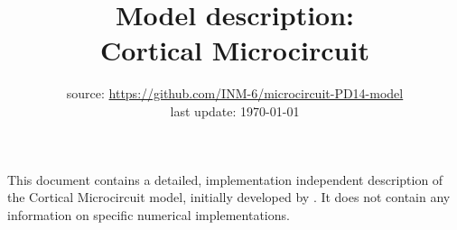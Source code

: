 \documentclass[10pt,a4paper,twoside,american]{article}
\theoremstyle{definitionstyle}
\begin{document}
\title{Model description:\\ \textbf{Cortical Microcircuit} \citep{Potjans14}}
\author{}
\date{%
  source: \href{https://github.com/INM-6/microcircuit-PD14-model}{https://github.com/INM-6/microcircuit-PD14-model}\\[1ex]
  last update: \today\\
}
\maketitle
\thispagestyle{empty}
\noindent
This document contains a detailed, implementation independent description of the Cortical Microcircuit model, initially developed by \citet{Potjans14}.
It does not contain any information on specific numerical implementations.

\def\marg{1ex}
\setlength{\parindent}{0pt}

\tableofcontents
\clearpage
\end{document}
